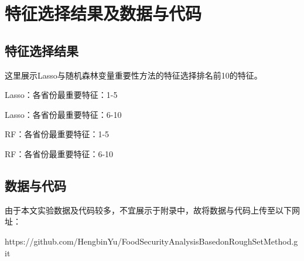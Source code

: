 \chapter{特征选择结果及数据与代码}

\section{特征选择结果}
这里展示Lasso与随机森林变量重要性方法的特征选择排名前10的特征。
\begin{table}[!htbp]
    \centering
    \caption{Lasso：各省份最重要特征：1-5}
    \label{table:Feature5_Lasso1}
    \resizebox{\textwidth}{!}
    {
    }
\end{table}
\setlength{\floatsep}{0pt}
\begin{table}[!htbp]
    \centering
    \caption{Lasso：各省份最重要特征：6-10}
    \label{table:Feature5_Lasso2}
    \resizebox{\textwidth}{!}
    {
    }
\end{table}
\setlength{\floatsep}{0pt}
\begin{table}[!htbp]
    \centering
    \caption{RF：各省份最重要特征：1-5}
    \label{table:Feature5_RF1}
    \resizebox{\textwidth}{!}
    {
    }
\end{table}
\setlength{\floatsep}{0pt}
\begin{table}[!htbp]
    \centering
    \caption{RF：各省份最重要特征：6-10}
    \label{table:Feature5_RF2}
    \resizebox{\textwidth}{!}
    {
    }
\end{table}

\section{数据与代码}

由于本文实验数据及代码较多，不宜展示于附录中，故将数据与代码上传至以下网址：

https://github.com/HengbinYu/FoodSecurityAnalysisBasedonRoughSetMethod.git



